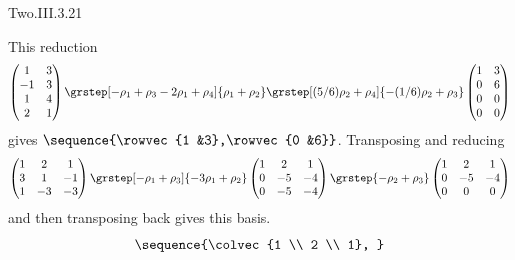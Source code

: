 \begin{ans}{Two.III.3.21}
      \begin{exparts}
        \partsitem This reduction
          \begin{equation*}
             \begin{pmatrix}
               1  &3  \\
              -1  &3  \\
               1  &4  \\
               2  &1
             \end{pmatrix}
             \grstep[-\rho_1+\rho_3 \\ -2\rho_1+\rho_4]{\rho_1+\rho_2}
             \grstep[(5/6)\rho_2+\rho_4]{-(1/6)\rho_2+\rho_3}
             \begin{pmatrix}
               1  &3  \\
               0  &6  \\
               0  &0  \\
               0  &0
             \end{pmatrix}
          \end{equation*}
          gives \( \sequence{\rowvec{1 &3},\rowvec{0 &6}} \).
        \partsitem Transposing and reducing
          \begin{equation*}
             \begin{pmatrix}
               1  &2  &1  \\
               3  &1  &-1 \\
               1  &-3 &-3
             \end{pmatrix}
             \grstep[-\rho_1+\rho_3]{-3\rho_1+\rho_2}
             \begin{pmatrix}
               1  &2  &1  \\
               0  &-5 &-4 \\
               0  &-5 &-4
             \end{pmatrix}
             \grstep{-\rho_2+\rho_3}
             \begin{pmatrix}
               1  &2  &1  \\
               0  &-5 &-4 \\
               0  &0  &0
             \end{pmatrix}
          \end{equation*}
          and then transposing back gives this basis.
          \begin{equation*}
            \sequence{\colvec{1 \\ 2 \\ 1},
}
\end{equation*}
\end{exparts}
\end{ans}
